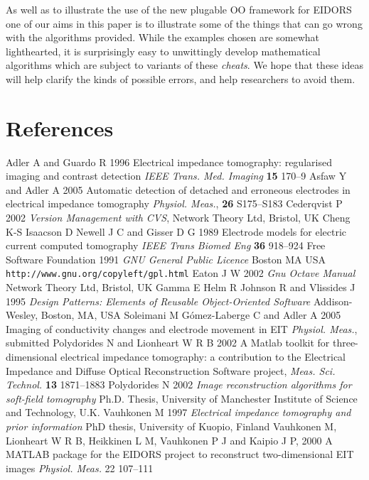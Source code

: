\documentclass[12pt]{iopart}
\begin{document}
As well as to illustrate the use of the new plugable OO
framework for EIDORS one of our aims in this paper is to
illustrate some of the things
that can go wrong with the algorithms provided.
While the examples chosen are somewhat lighthearted, it
is surprisingly easy to unwittingly develop mathematical
algorithms which are subject to variants of these {\em cheats}.
We hope that these ideas will help clarify the kinds of
possible errors, and help researchers to avoid them.


\section*{References}
\begin{thebibliography}{99}
Adler A and Guardo R
1996
Electrical impedance tomography: regularised imaging and contrast detection 
\textit{IEEE Trans. Med. Imaging} \textbf{15} 170--9
Asfaw Y and Adler A
 2005
Automatic detection of detached and erroneous electrodes in electrical impedance tomography
{\it Physiol. Meas.}, {\bf 26} S175--S183
Cederqvist P 2002
{\it Version Management with CVS},
Network Theory Ltd, Bristol, UK
Cheng K-S
Isaacson D
Newell J C and
Gisser D G
1989
Electrode models for electric current
computed tomography
{\it IEEE Trans Biomed Eng}
{\bf 36} 918--924
Free Software Foundation 1991
{\it GNU General Public Licence}
Boston MA USA
{\tt http://www.gnu.org/copyleft/gpl.html}
Eaton J W 2002
{\it Gnu Octave Manual}
Network Theory Ltd, Bristol, UK
Gamma E Helm R Johnson R and Vlissides J 1995
{\it Design Patterns: Elements of Reusable Object-Oriented Software}
Addison-Wesley, Boston, MA, USA
Soleimani M G\'omez-Laberge C and Adler A 2005
Imaging of conductivity changes and electrode movement in EIT
{\it Physiol. Meas.}, submitted
Polydorides N and Lionheart W R B
2002
A Matlab toolkit for three-dimensional electrical impedance
tomography: a contribution to the Electrical Impedance and
Diffuse Optical Reconstruction Software project,
{\it Meas. Sci. Technol.} {\bf 13} 1871--1883 
Polydorides N 
2002
{\it Image reconstruction algorithms for soft-field tomography}
Ph.D. Thesis,
University of Manchester Institute of Science and Technology, U.K. 
Vauhkonen M 
1997
{\it Electrical impedance tomography and prior information}
PhD thesis, University of Kuopio, Finland 
Vauhkonen M,
Lionheart W R B,
Heikkinen L M,
Vauhkonen P J and
Kaipio J P, 
2000
A MATLAB package for the EIDORS project to reconstruct
two-dimensional EIT images
{\it Physiol. Meas.} 22 107--111 
\end{thebibliography}
\end{document}
